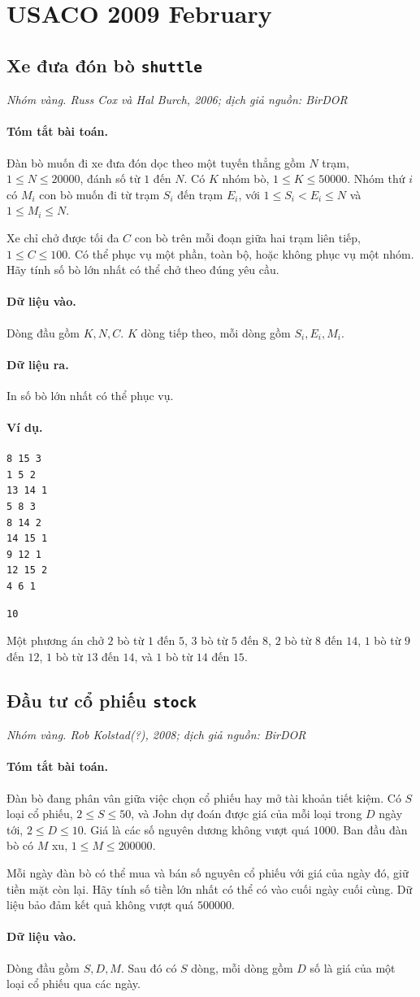 \documentclass[11pt]{article}
\newcommand{\problem}[4]{%
  \subsection[#1 (#2)]{#1 \hfill {\normalsize\texttt{#2}}}%
  \noindent\textit{#3. #4}\par\smallskip
}
\newcommand{\iosec}[1]{\paragraph{#1}}
\begin{document}
\section{USACO 2009 February}

\problem{Xe đưa đón bò}{shuttle}{Nhóm vàng}{Russ Cox và Hal Burch, 2006; dịch giả nguồn: BirDOR}

\iosec{Tóm tắt bài toán.}
Đàn bò muốn đi xe đưa đón dọc theo một tuyến thẳng gồm \(N\) trạm,
\(1\le N\le 20000\), đánh số từ \(1\) đến \(N\). Có \(K\) nhóm bò,
\(1\le K\le 50000\). Nhóm thứ \(i\) có \(M_i\) con bò muốn đi từ trạm
\(S_i\) đến trạm \(E_i\), với \(1\le S_i<E_i\le N\) và \(1\le M_i\le N\).

Xe chỉ chở được tối đa \(C\) con bò trên mỗi đoạn giữa hai trạm liên tiếp,
\(1\le C\le 100\). Có thể phục vụ một phần, toàn bộ, hoặc không phục vụ một
nhóm. Hãy tính số bò lớn nhất có thể chở theo đúng yêu cầu.

\iosec{Dữ liệu vào.}
Dòng đầu gồm \(K,N,C\). \(K\) dòng tiếp theo, mỗi dòng gồm \(S_i,E_i,M_i\).

\iosec{Dữ liệu ra.}
In số bò lớn nhất có thể phục vụ.

\iosec{Ví dụ.}
\begin{verbatim}
8 15 3
1 5 2
13 14 1
5 8 3
8 14 2
14 15 1
9 12 1
12 15 2
4 6 1
\end{verbatim}

\begin{verbatim}
10
\end{verbatim}

Một phương án chở \(2\) bò từ \(1\) đến \(5\), \(3\) bò từ \(5\) đến \(8\),
\(2\) bò từ \(8\) đến \(14\), \(1\) bò từ \(9\) đến \(12\), \(1\) bò từ
\(13\) đến \(14\), và \(1\) bò từ \(14\) đến \(15\).

\problem{Đầu tư cổ phiếu}{stock}{Nhóm vàng}{Rob Kolstad(?), 2008; dịch giả nguồn: BirDOR}

\iosec{Tóm tắt bài toán.}
Đàn bò đang phân vân giữa việc chọn cổ phiếu hay mở tài khoản tiết kiệm. Có
\(S\) loại cổ phiếu, \(2\le S\le 50\), và John dự đoán được giá của mỗi loại
trong \(D\) ngày tới, \(2\le D\le 10\). Giá là các số nguyên dương không vượt
quá \(1000\). Ban đầu đàn bò có \(M\) xu, \(1\le M\le 200000\).

Mỗi ngày đàn bò có thể mua và bán số nguyên cổ phiếu với giá của ngày đó,
giữ tiền mặt còn lại. Hãy tính số tiền lớn nhất có thể có vào cuối ngày cuối
cùng. Dữ liệu bảo đảm kết quả không vượt quá \(500000\).

\iosec{Dữ liệu vào.}
Dòng đầu gồm \(S,D,M\). Sau đó có \(S\) dòng, mỗi dòng gồm \(D\) số là giá
của một loại cổ phiếu qua các ngày.
\end{document}
